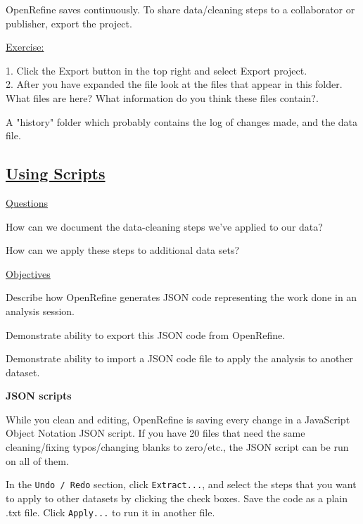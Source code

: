 \documentclass[12pt]{article}
\begin{document}
OpenRefine saves continuously. To share data/cleaning steps to a collaborator or publisher, export the project. 

\vspace{0.5em}
\begin{addmargin}[1cm]{0cm}
\color{gray}
\underline{Exercise:}

1. Click the Export button in the top right and select Export project.
\\2. After you have expanded the file look at the files that appear in this folder. What files are here? What information do you think these files contain?.

\color{black}\vspace{0.5em}
A "history" folder which probably contains the log of changes made, and the data file. 

\end{addmargin}

\vspace{-0.5em}\subsection{\href{https://datacarpentry.org/openrefine-socialsci/05-scripts/index.html}{\textbf{Using Scripts}}}
\color{gray}
\underline{Questions}

How can we document the data-cleaning steps we’ve applied to our data?

How can we apply these steps to additional data sets?

\underline{Objectives}

Describe how OpenRefine generates JSON code representing the work done in an analysis session.

Demonstrate ability to export this JSON code from OpenRefine.

Demonstrate ability to import a JSON code file to apply the analysis to another dataset.

\color{black}
\vspace{0.7em}
\textbf{JSON scripts}

While you clean and editing, OpenRefine is saving every change in a JavaScript Object Notation JSON script. If you have 20 files that need the same cleaning/fixing typos/changing blanks to zero/etc., the JSON script can be run on all of them.

In the \texttt{Undo / Redo} section, click \texttt{Extract...}, and select the steps that you want to apply to other datasets by clicking the check boxes. Save the code as a plain .txt file. Click \texttt{Apply...} to run it in another file.
\end{document}
